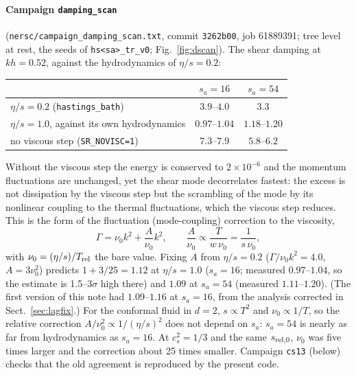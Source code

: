 \documentclass[11pt,aps,preprint,nofootinbib,superscriptaddress,tightenlines]{revtex4-2}
\def\st{\begin{equation}}
\def\stp{\end{equation}}
\def\Sect#1{Sect.~\ref{#1}}
\def\Fig#1{Fig.~\ref{#1}}
\let\oldparagraph\paragraph
\renewcommand{\paragraph}{\par\bigskip\oldparagraph}
\begin{document}
\paragraph{Campaign \texttt{damping\_scan}} (\texttt{nersc/campaign\_damping\_scan.txt}, commit \texttt{3262b00}, job 61889391; tree level at
rest, the seeds of \texttt{hs<sa>\_tr\_v0}; \Fig{fig:dscan}).  The shear damping at $kh=0.52$, against the hydrodynamics of
$\eta/s=0.2$:
\begin{center}
\begin{tabular}{lcc}
\toprule
 & $s_a=16$ & $s_a=54$ \\ \midrule
$\eta/s=0.2$ (\texttt{hastings\_bath}) & $3.9$--$4.0$ & $3.3$ \\
$\eta/s=1.0$, against its own hydrodynamics & $0.97$--$1.04$ & $1.18$--$1.20$ \\
no viscous step (\texttt{SR\_NOVISC=1}) & $7.3$--$7.9$ & $5.8$--$6.2$ \\
\bottomrule
\end{tabular}
\end{center}
Without the viscous step the energy is conserved to $2\times10^{-6}$ and the momentum fluctuations are unchanged, yet the shear mode
decorrelates fastest: the excess is not dissipation by the viscous step but the scrambling of the mode by its nonlinear coupling to
the thermal fluctuations, which the viscous step reduces.  This is the form of the fluctuation (mode-coupling) correction to the
viscosity,
\st
\Gamma=\nu_0k^2+\frac{A}{\nu_0}k^2,\qquad \frac{A}{\nu_0}\propto\frac{T}{w\,\nu_0}=\frac{1}{s\,\nu_0},
\label{eq:loop}
\stp
with $\nu_0=(\eta/s)/T_{\rm rel}$ the bare value.  Fixing $A$ from $\eta/s=0.2$ ($\Gamma/\nu_0k^2=4.0$, $A=3\nu_0^2$) predicts
$1+3/25=1.12$ at $\eta/s=1.0$ ($s_a=16$; measured $0.97$--$1.04$, so the estimate is 1.5--3$\sigma$ high there) and $1.09$ at $s_a=54$
(measured $1.11$--$1.20$).  (The first version of this note had $1.09$--$1.16$ at $s_a=16$, from the analysis corrected in \Sect{sec:lagfix}.)  For the
conformal fluid in $d=2$, $s\propto T^2$ and $\nu_0\propto1/T$, so the relative correction $A/\nu_0^2\propto1/(\eta/s)^2$ does not
depend on $s_a$: $s_a=54$ is nearly as far from hydrodynamics as $s_a=16$.  At $c_s^2=1/3$ and the same $s_{\rm rel,0}$, $\nu_0$ was five times
larger and the correction about 25 times smaller.  Campaign \texttt{cs13} (below) checks that the old agreement is reproduced by the present code.
\end{document}

